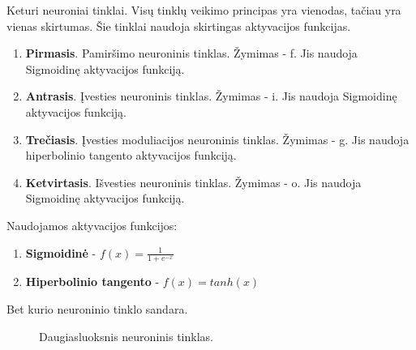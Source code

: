 Keturi neuroniai tinklai. Visų tinklų veikimo principas yra vienodas, tačiau yra vienas skirtumas. Šie tinklai naudoja skirtingas aktyvacijos funkcijas.
\begin{enumerate}
  \item \textbf{Pirmasis}. Pamiršimo neuroninis tinklas. Žymimas - f. Jis naudoja Sigmoidinę aktyvacijos funkciją.
  \item \textbf{Antrasis}. Įvesties neuroninis tinklas. Žymimas - i. Jis naudoja Sigmoidinę aktyvacijos funkciją.
  \item \textbf{Trečiasis}. Įvesties moduliacijos neuroninis tinklas. Žymimas - g. Jis naudoja hiperbolinio tangento aktyvacijos funkciją.
  \item \textbf{Ketvirtasis}. Išvesties neuroninis tinklas. Žymimas - o. Jis naudoja Sigmoidinę aktyvacijos funkciją.
\end{enumerate}

Naudojamos aktyvacijos funkcijos:
\begin{enumerate}
  \item \textbf{Sigmoidinė} - $f(x) = \frac{1}{1+e^{-x}}$
  \item \textbf{Hiperbolinio tangento} - $f(x) = tanh(x)$
\end{enumerate}

Bet kurio neuroninio tinklo sandara.

\begin{figure}[h!]
  \centering
{}
\caption{Daugiasluoksnis neuroninis tinklas.}
\label{fig:drawing}
\end{figure}



